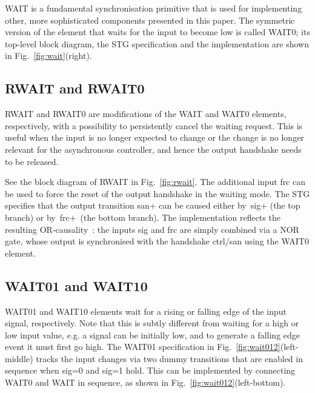 \documentclass[conference]{IEEEtran}
\begin{document}
\textsf{WAIT} is a fundamental synchronisation primitive that is used for
implementing other, more sophisticated components presented in this paper.
The symmetric version of the element that waits for the input to become low is
called \textsf{WAIT0}; its top-level block diagram, the STG specification and
the implementation are shown in Fig.~\ref{fig:wait}(right).

\vspace{-0.5mm}
\subsection*{\textsf{RWAIT} and \textsf{RWAIT0}}
\vspace{-0.5mm}

\textsf{RWAIT} and \textsf{RWAIT0} are modifications of the \textsf{WAIT} and \textsf{WAIT0}
elements, respectively, with a possibility to persistently cancel the waiting request. This
is useful when the input is no longer expected to change or the change is no longer relevant
for the asynchronous controller, and hence the output handshake needs to be released.

See the block diagram of \textsf{RWAIT} in Fig.~\ref{fig:rwait}. The additional input
\textsf{frc} can be used to force the reset of the output handshake in the waiting mode. The
STG specifies that the output transition \textsf{san+} can be caused either by~\textsf{sig+}
(the top branch) or by~\textsf{frc+}~(the bottom branch). The implementation reflects the resulting
OR-causality~\cite{1996_yakovlev_or}: the inputs \textsf{sig} and \textsf{frc} are simply
combined via a NOR gate, whose output is synchronised with the handshake \textsf{ctrl/san}
using the \textsf{WAIT0} element.

\vspace{-0.5mm}
\subsection*{\textsf{WAIT01} and \textsf{WAIT10}}
\vspace{-0.5mm}

\textsf{WAIT01} and \textsf{WAIT10} elements wait for a rising or falling edge of the input
signal, respectively. Note that this is subtly different from waiting for a high or low input value,
e.g. a signal can be initially low, and to generate a falling edge event it must first go high.
The \textsf{WAIT01} specification in Fig.~\ref{fig:wait012}(left-middle) tracks the input changes
via two dummy transitions that are enabled in sequence when \textsf{sig=0} and \textsf{sig=1} hold.
This can be implemented by connecting \textsf{WAIT0} and \textsf{WAIT} in sequence,
as shown in Fig.~\ref{fig:wait012}(left-bottom).
\end{document}
